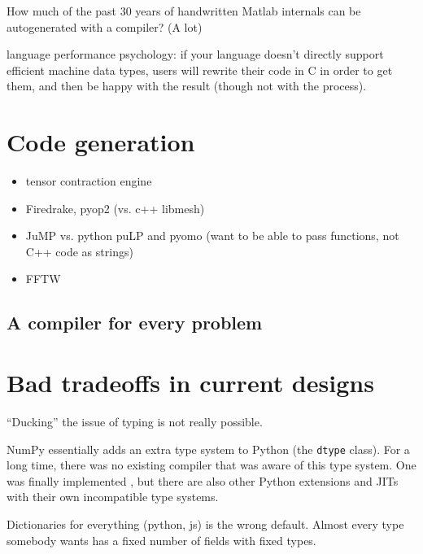 {How much of the past 30 years of handwritten Matlab internals can
be autogenerated with a compiler? (A lot)

language performance psychology:
if your language doesn't directly support efficient machine data types,
users will rewrite their code in C in order to get them, and then be
happy with the result (though not with the process).


\section{Code generation}

\begin{itemize}
\item tensor contraction engine
\item Firedrake, pyop2 (vs. c++ libmesh)
\item JuMP vs. python puLP and pyomo
  (want to be able to pass functions, not C++ code as strings)
\item FFTW
\end{itemize}

\subsection{A compiler for every problem}

\cite{hopepython}


\section{Bad tradeoffs in current designs}

``Ducking'' the issue of typing is not really possible.

NumPy essentially adds an extra type system to Python (the
\texttt{dtype} class). For a long time, there was no existing
compiler that was aware of this type system. One was finally
implemented \cite{oliphant2012numba}, but there are also
other Python extensions and JITs with their own incompatible
type systems.


Dictionaries for everything (python, js) is the wrong default. Almost every
type somebody wants has a fixed number of fields with fixed types.

}
